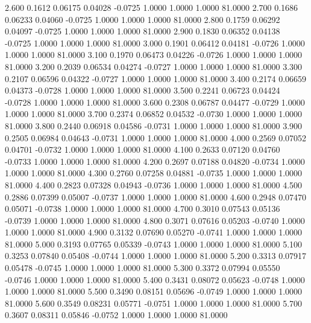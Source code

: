    2.600   0.1612   0.06175   0.04028  -0.0725   1.0000   1.0000   1.0000  81.0000
   2.700   0.1686   0.06233   0.04060  -0.0725   1.0000   1.0000   1.0000  81.0000
   2.800   0.1759   0.06292   0.04097  -0.0725   1.0000   1.0000   1.0000  81.0000
   2.900   0.1830   0.06352   0.04138  -0.0725   1.0000   1.0000   1.0000  81.0000
   3.000   0.1901   0.06412   0.04181  -0.0726   1.0000   1.0000   1.0000  81.0000
   3.100   0.1970   0.06473   0.04226  -0.0726   1.0000   1.0000   1.0000  81.0000
   3.200   0.2039   0.06534   0.04274  -0.0727   1.0000   1.0000   1.0000  81.0000
   3.300   0.2107   0.06596   0.04322  -0.0727   1.0000   1.0000   1.0000  81.0000
   3.400   0.2174   0.06659   0.04373  -0.0728   1.0000   1.0000   1.0000  81.0000
   3.500   0.2241   0.06723   0.04424  -0.0728   1.0000   1.0000   1.0000  81.0000
   3.600   0.2308   0.06787   0.04477  -0.0729   1.0000   1.0000   1.0000  81.0000
   3.700   0.2374   0.06852   0.04532  -0.0730   1.0000   1.0000   1.0000  81.0000
   3.800   0.2440   0.06918   0.04586  -0.0731   1.0000   1.0000   1.0000  81.0000
   3.900   0.2505   0.06984   0.04643  -0.0731   1.0000   1.0000   1.0000  81.0000
   4.000   0.2569   0.07052   0.04701  -0.0732   1.0000   1.0000   1.0000  81.0000
   4.100   0.2633   0.07120   0.04760  -0.0733   1.0000   1.0000   1.0000  81.0000
   4.200   0.2697   0.07188   0.04820  -0.0734   1.0000   1.0000   1.0000  81.0000
   4.300   0.2760   0.07258   0.04881  -0.0735   1.0000   1.0000   1.0000  81.0000
   4.400   0.2823   0.07328   0.04943  -0.0736   1.0000   1.0000   1.0000  81.0000
   4.500   0.2886   0.07399   0.05007  -0.0737   1.0000   1.0000   1.0000  81.0000
   4.600   0.2948   0.07470   0.05071  -0.0738   1.0000   1.0000   1.0000  81.0000
   4.700   0.3010   0.07543   0.05136  -0.0739   1.0000   1.0000   1.0000  81.0000
   4.800   0.3071   0.07616   0.05203  -0.0740   1.0000   1.0000   1.0000  81.0000
   4.900   0.3132   0.07690   0.05270  -0.0741   1.0000   1.0000   1.0000  81.0000
   5.000   0.3193   0.07765   0.05339  -0.0743   1.0000   1.0000   1.0000  81.0000
   5.100   0.3253   0.07840   0.05408  -0.0744   1.0000   1.0000   1.0000  81.0000
   5.200   0.3313   0.07917   0.05478  -0.0745   1.0000   1.0000   1.0000  81.0000
   5.300   0.3372   0.07994   0.05550  -0.0746   1.0000   1.0000   1.0000  81.0000
   5.400   0.3431   0.08072   0.05623  -0.0748   1.0000   1.0000   1.0000  81.0000
   5.500   0.3490   0.08151   0.05696  -0.0749   1.0000   1.0000   1.0000  81.0000
   5.600   0.3549   0.08231   0.05771  -0.0751   1.0000   1.0000   1.0000  81.0000
   5.700   0.3607   0.08311   0.05846  -0.0752   1.0000   1.0000   1.0000  81.0000
